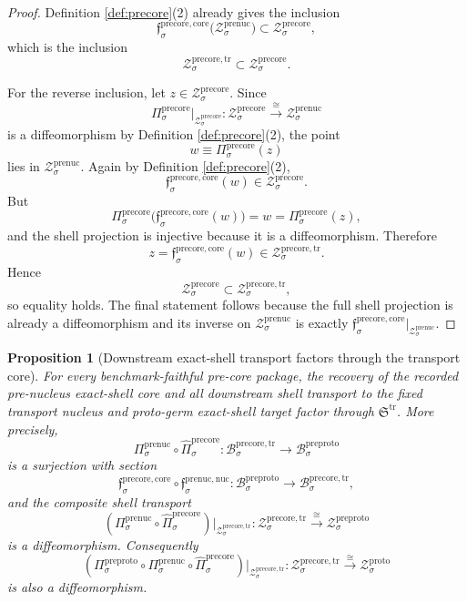 \documentclass[11pt]{article}
\newcommand{\ProtoShellSet}[1]{\mathcal Z_{#1}^{\mathrm{proto}}}
\newcommand{\PreProtoBody}[1]{\mathcal B_{#1}^{\mathrm{preproto}}}
\newcommand{\PreProtoProj}[1]{\Pi_{#1}^{\mathrm{preproto}}}
\newcommand{\PreProtoShellSet}[1]{\mathcal Z_{#1}^{\mathrm{preproto}}}
\newcommand{\PreNucProj}[1]{\Pi_{#1}^{\mathrm{prenuc}}}
\newcommand{\PreNucNucleusMin}[1]{\mathfrak f_{#1}^{\mathrm{prenuc,nuc}}}
\newcommand{\PreNucShellSet}[1]{\mathcal Z_{#1}^{\mathrm{prenuc}}}
\newcommand{\PreCoreTransportCore}{\mathfrak S^{\mathrm{tr}}}
\newcommand{\PreCoreProj}[1]{\Pi_{#1}^{\mathrm{precore}}}
\newcommand{\PreCoreCoreMin}[1]{\mathfrak f_{#1}^{\mathrm{precore,core}}}
\newcommand{\PreCoreShellSet}[1]{\mathcal Z_{#1}^{\mathrm{precore}}}
\newcommand{\PreCoreTrBody}[1]{\mathcal B_{#1}^{\mathrm{precore,tr}}}
\newcommand{\PreCoreTrProj}[1]{\widehat{\Pi}_{#1}^{\mathrm{precore}}}
\newcommand{\PreCoreTrShell}[1]{\mathcal Z_{#1}^{\mathrm{precore,tr}}}
\newtheorem{proposition}{Proposition}
\begin{document}
\begin{proof}
Definition \ref{def:precore}(2) already gives the inclusion
\[
\PreCoreCoreMin{\sigma}\bigl(\PreNucShellSet{\sigma}\bigr)
\subset
\PreCoreShellSet{\sigma},
\]
which is the inclusion
\[
\PreCoreTrShell{\sigma}\subset\PreCoreShellSet{\sigma}.
\]

For the reverse inclusion, let \(z\in\PreCoreShellSet{\sigma}\). Since
\[
\PreCoreProj{\sigma}\big|_{\PreCoreShellSet{\sigma}}
:
\PreCoreShellSet{\sigma}\xrightarrow{\cong}\PreNucShellSet{\sigma}
\]
is a diffeomorphism by Definition \ref{def:precore}(2), the point
\[
w\equiv\PreCoreProj{\sigma}(z)
\]
lies in \(\PreNucShellSet{\sigma}\). Again by Definition \ref{def:precore}(2),
\[
\PreCoreCoreMin{\sigma}(w)\in\PreCoreShellSet{\sigma}.
\]
But
\[
\PreCoreProj{\sigma}\bigl(\PreCoreCoreMin{\sigma}(w)\bigr)=w=\PreCoreProj{\sigma}(z),
\]
and the shell projection is injective because it is a diffeomorphism. Therefore
\[
z=\PreCoreCoreMin{\sigma}(w)\in\PreCoreTrShell{\sigma}.
\]
Hence
\[
\PreCoreShellSet{\sigma}\subset\PreCoreTrShell{\sigma},
\]
so equality holds. The final statement follows because the full shell projection is already a diffeomorphism and its inverse on \(\PreNucShellSet{\sigma}\) is exactly \(\PreCoreCoreMin{\sigma}\big|_{\PreNucShellSet{\sigma}}\).
\end{proof}

\begin{proposition}[Downstream exact-shell transport factors through the transport core]
\label{prop:downstream}
For every benchmark-faithful pre-core package, the recovery of the recorded pre-nucleus exact-shell core and all downstream shell transport to the fixed transport nucleus and proto-germ exact-shell target factor through \(\PreCoreTransportCore\). More precisely,
\[
\PreNucProj{\sigma}\circ\PreCoreTrProj{\sigma}
:
\PreCoreTrBody{\sigma}\to\PreProtoBody{\sigma}
\]
is a surjection with section
\[
\PreCoreCoreMin{\sigma}\circ\PreNucNucleusMin{\sigma}
:
\PreProtoBody{\sigma}\to\PreCoreTrBody{\sigma},
\]
and the composite shell transport
\[
(\PreNucProj{\sigma}\circ\PreCoreTrProj{\sigma})\big|_{\PreCoreTrShell{\sigma}}
:
\PreCoreTrShell{\sigma}
\xrightarrow{\cong}
\PreProtoShellSet{\sigma}
\]
is a diffeomorphism. Consequently
\[
(\PreProtoProj{\sigma}\circ\PreNucProj{\sigma}\circ\PreCoreTrProj{\sigma})\big|_{\PreCoreTrShell{\sigma}}
:
\PreCoreTrShell{\sigma}
\xrightarrow{\cong}
\ProtoShellSet{\sigma}
\]
is also a diffeomorphism.
\end{proposition}
\end{document}
